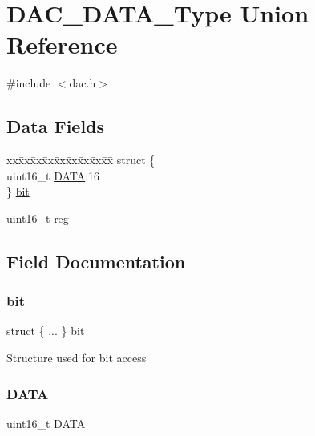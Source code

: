 \hypertarget{union_d_a_c___d_a_t_a___type}{}\section{D\+A\+C\+\_\+\+D\+A\+T\+A\+\_\+\+Type Union Reference}
\label{union_d_a_c___d_a_t_a___type}


{\ttfamily \#include $<$dac.\+h$>$}

\subsection*{Data Fields}
\begin{DoxyCompactItemize}
\item 
\begin{tabbing}
xx\=xx\=xx\=xx\=xx\=xx\=xx\=xx\=xx\=\kill
struct \{\\
\>uint16\_t \mbox{\hyperlink{union_d_a_c___d_a_t_a___type_acd1c79d588901607c16e8e825ec70487}{DATA}}:16\\
\} \mbox{\hyperlink{union_d_a_c___d_a_t_a___type_acb3123267490be71001e8440afd24c02}{bit}}\\

\end{tabbing}\item 
uint16\+\_\+t \mbox{\hyperlink{union_d_a_c___d_a_t_a___type_a11760f5020019f4aa8cb02e694f7cc44}{reg}}
\end{DoxyCompactItemize}


\subsection{Field Documentation}
\mbox{\label{union_d_a_c___d_a_t_a___type_acb3123267490be71001e8440afd24c02}} 
\subsubsection{\texorpdfstring{bit}{bit}}
{\footnotesize\ttfamily struct \{ ... \}   bit}

Structure used for bit access \mbox{\label{union_d_a_c___d_a_t_a___type_acd1c79d588901607c16e8e825ec70487}} 
\subsubsection{\texorpdfstring{DATA}{DATA}}
{\footnotesize\ttfamily uint16\+\_\+t D\+A\+TA}


